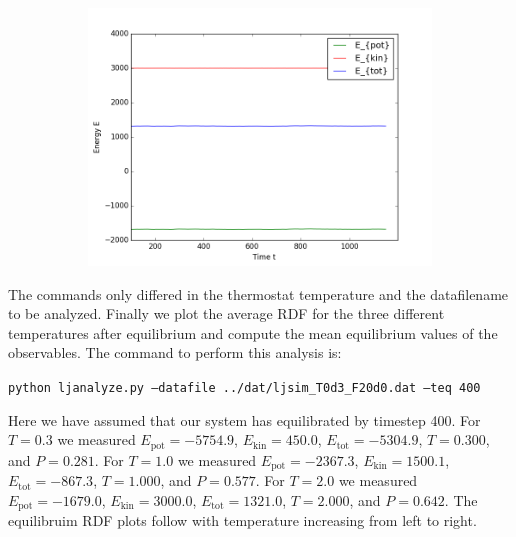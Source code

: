\begin{figure}[ht]
\begin{subfigure}{0.3\textwidth}
\includegraphics[width=\textwidth]{fig/avEnergies_T2d0_F20d0_M100.png}
\end{subfigure}
\end{figure}

The commands only differed in the thermostat temperature and the datafilename to be analyzed. Finally we plot the average RDF for the three different temperatures after equilibrium and compute the mean equilibrium values of the observables. The command to perform this analysis is:

{\tt python ljanalyze.py --datafile ../dat/ljsim\_T0d3\_F20d0.dat --teq 400}

\noindent Here we have assumed that our system has equilibrated by timestep 400. For $T = 0.3$ we measured $E_\mathrm{pot} = -5754.9$, $E_\mathrm{kin} = 450.0$, $E_\mathrm{tot} = -5304.9$, $T = 0.300$, and $P = 0.281$. For  $T = 1.0$ we measured $E_\mathrm{pot} = -2367.3$, $E_\mathrm{kin} = 1500.1$, $E_\mathrm{tot} = -867.3$, $T = 1.000$, and $P = 0.577$. For $T = 2.0$ we measured $E_\mathrm{pot} = -1679.0$, $E_\mathrm{kin} = 3000.0$, $E_\mathrm{tot} = 1321.0$, $T = 2.000$, and $P = 0.642$. The equilibruim RDF plots follow with temperature increasing from left to right.

